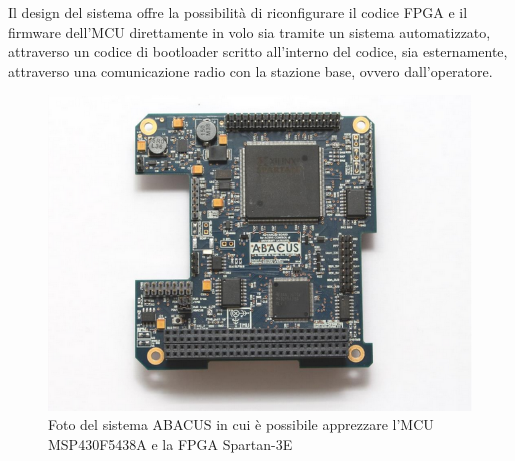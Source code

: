 \documentclass[LaM,binding=0.6cm,oneside]{../sapthesis}
\begin{document}
Il design del sistema offre la possibilità di riconfigurare il codice FPGA e il firmware dell'MCU direttamente in volo sia tramite un sistema automatizzato, attraverso un codice di bootloader scritto all'interno del codice, sia esternamente, attraverso una comunicazione radio con la stazione base, ovvero dall'operatore.

    \begin{figure}[htbp]
    \centerline{\includegraphics[scale=.67]{examples/AbacusImage.PNG}}
    \caption{Foto del sistema ABACUS in cui è possibile apprezzare l'MCU MSP430F5438A e la FPGA Spartan-3E}
    \label{fig}
    \end{figure}
    \clearpage
    
\end{document}
